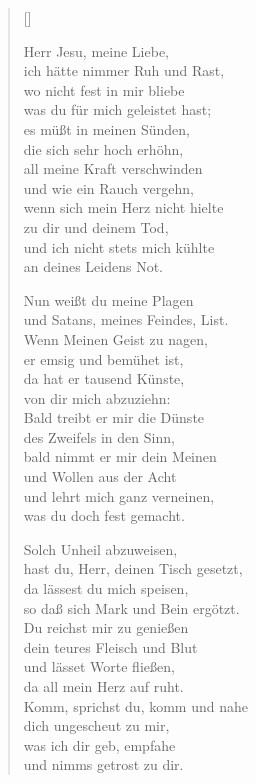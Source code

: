 \begin{multicols}{2}
\settowidth{\versewidth}{Nun weißt du meine Plagen}
\begin{verse}[\versewidth]


 Herr Jesu, meine Liebe,\\
ich hätte nimmer Ruh und Rast,\\
wo nicht fest in mir bliebe\\
was du für mich geleistet hast;\\
es müßt in meinen Sünden,\\
die sich sehr hoch erhöhn,\\
all meine Kraft verschwinden\\
und wie ein Rauch vergehn,\\
wenn sich mein Herz nicht hielte\\
zu dir und deinem Tod,\\
und ich nicht stets mich kühlte\\
an deines Leidens Not.

 Nun weißt du meine Plagen\\
und Satans, meines Feindes, List.\\
Wenn Meinen Geist zu nagen,\\
er emsig und bemühet ist,\\
da hat er tausend Künste,\\
von dir mich abzuziehn:\\
Bald treibt er mir die Dünste\\
des Zweifels in den Sinn,\\
bald nimmt er mir dein Meinen\\
und Wollen aus der Acht\\
und lehrt mich ganz verneinen,\\
was du doch fest gemacht.

 Solch Unheil abzuweisen,\\
hast du, Herr, deinen Tisch gesetzt,\\
da lässest du mich speisen,\\
so daß sich Mark und Bein ergötzt.\\
Du reichst mir zu genießen\\
dein teures Fleisch und Blut\\
und lässet Worte fließen,\\
da all mein Herz auf ruht.\\
Komm, sprichst du, komm und nahe\\
dich ungescheut zu mir,\\
was ich dir geb, empfahe\\
und nimms getrost zu dir.


\end{verse}
\end{multicols}
